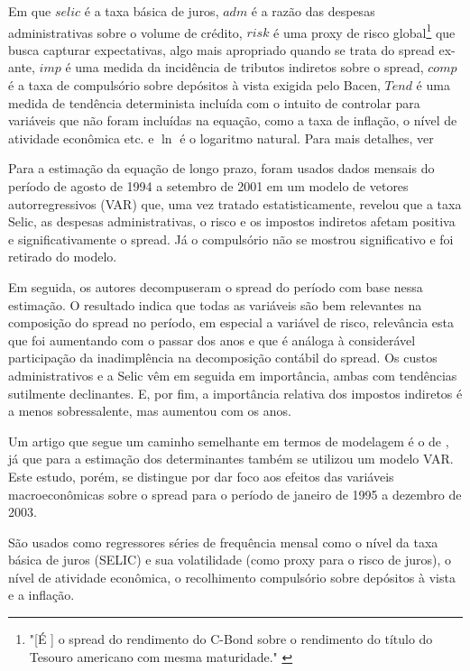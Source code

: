 \documentclass[a4paper, article, 12pt, openany, oneside, english, brazil]{abntex2}
\begin{document}
    Em que $selic$ é a taxa básica de juros, $adm$ é a razão das despesas administrativas sobre o volume de crédito, $risk$ é uma proxy de risco global\footnote{"[É ] o spread do rendimento do C-Bond sobre o rendimento do título do Tesouro americano com mesma maturidade." \cite[p.~10]{nakane02}} que busca capturar expectativas, algo mais apropriado quando se trata do spread ex-ante, $imp$ é uma medida da incidência de tributos indiretos sobre o spread, $comp$ é a taxa de compulsório sobre depósitos à vista exigida pelo Bacen,  $Tend$ é uma medida de tendência determinista incluída com o intuito de controlar para variáveis que não foram incluídas na equação, como a taxa de inflação, o nível de atividade econômica etc. e $\ln$ é o logaritmo natural.  Para mais detalhes, ver 

    Para a estimação da equação de longo prazo, foram usados dados mensais do período de agosto de 1994 a setembro de 2001 em um modelo de vetores autorregressivos (VAR) que, uma vez tratado estatisticamente, revelou que a taxa Selic, as despesas administrativas, o risco e os impostos indiretos afetam positiva e significativamente o spread. Já o compulsório não se mostrou significativo e foi retirado do modelo.

    Em seguida, os autores decompuseram o spread do período com base nessa estimação. O resultado indica que todas as variáveis são bem relevantes na composição do spread no período, em especial a variável de risco, relevância esta que foi aumentando com o passar dos anos e que é análoga à considerável participação da inadimplência na decomposição contábil do spread. Os custos administrativos e a Selic vêm em seguida em importância, ambas com tendências sutilmente declinantes. E, por fim, a importância relativa dos impostos indiretos é a menos sobressalente, mas aumentou com os anos. 

    Um artigo que segue um caminho semelhante em termos de modelagem é o de , já que para a estimação dos determinantes também se utilizou um modelo VAR. Este estudo, porém, se distingue por dar foco aos efeitos das variáveis macroeconômicas sobre o spread para o período de janeiro de 1995 a dezembro de 2003. 
    
    São usados como regressores séries de frequência mensal como o nível da taxa básica de juros (SELIC) e sua volatilidade (como proxy para o risco de juros), o nível de atividade econômica, o recolhimento compulsório sobre depósitos à vista e a inflação.
\end{document}
